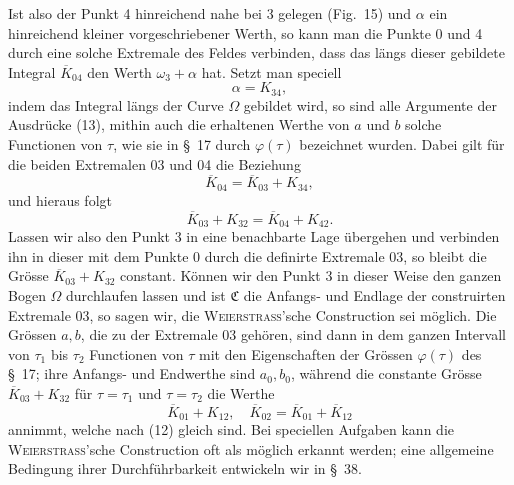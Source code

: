 \documentclass[11pt,a4paper,leqno]{article}
\begin{document}
Ist also der Punkt 4 hinreichend nahe bei 3 gelegen (Fig.~15) und $\alpha$ ein hinreichend kleiner vorgeschriebener Werth, so kann man die Punkte 0 und 4 durch eine solche Extremale des Feldes verbinden, dass das längs dieser gebildete Integral $\overline{K}_{04}$ den Werth $\omega_3+\alpha$ hat. Setzt man speciell
\[
\alpha=K_{34},
\]
indem das Integral längs der Curve $\Omega$ gebildet wird, so sind alle Argumente der Ausdrücke (13), mithin auch die erhaltenen Werthe von $a$ und $b$ solche Functionen von $\tau$, wie sie in \S~17 durch $\varphi(\tau)$ bezeichnet wurden. Dabei gilt für die beiden Extremalen 03 und 04 die Beziehung
\[
\overline{K}_{04}=\overline{K}_{03}+K_{34},
\]
und hieraus folgt
\[
\overline{K}_{03}+K_{32}=\overline{K}_{04}+K_{42}.
\]
Lassen wir also den Punkt 3 in eine benachbarte Lage übergehen und verbinden ihn in dieser mit dem Punkte 0 durch die definirte Extremale 03, so bleibt die Grösse $\overline{K}_{03}+K_{32}$ constant. Können wir den Punkt 3 in dieser Weise den ganzen Bogen $\Omega$
durchlaufen lassen und ist $\mathfrak{C}$ die Anfangs- und Endlage der construirten Extremale 03, so sagen wir, die \textsc{Weierstrass}'sche Construction sei möglich. Die Grössen $a,b$, die zu der Extremale 03 gehören, sind dann in dem ganzen Intervall von $\tau_1$ bis $\tau_2$ Functionen von $\tau$ mit den Eigenschaften der Grössen $\varphi(\tau)$ des \S~17; ihre Anfangs- und Endwerthe sind $a_0,b_0$, während die constante Grösse $\overline{K}_{03}+K_{32}$ für $\tau=\tau_1$ und $\tau=\tau_2$ die Werthe
\[
\overline{K}_{01}+K_{12},
\quad
\overline{K}_{02}=\overline{K}_{01}+\overline{K}_{12}
\]
annimmt, welche nach (12) gleich sind. Bei speciellen Aufgaben kann die \textsc{Weierstrass}'sche Construction oft als möglich erkannt werden; eine allgemeine Bedingung ihrer Durchführbarkeit entwickeln wir in \S~38.
\end{document}
